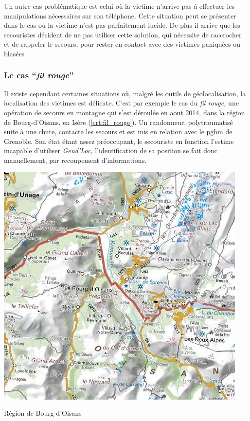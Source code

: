 Un autre cas problématique est celui où la victime n'arrive pas à
effectuer les manipulations nécessaires sur son téléphone. Cette
situation peut se présenter dans le cas ou la victime n'est pas
parfaitement lucide. De plus il arrive que les secouristes décident de
ne pas utiliser cette solution, qui nécessite de raccrocher et de
rappeler le secours, pour rester en contact avec des victimes
paniquées ou blasées

\subsubsection{Le cas \enquote{\emph{fil rouge}}}
\label{subsec:1-1-2-3}

Il existe cependant certaines situations où, malgré les outils de
géolocalisation, la localisation des victimes est délicate. C'est par
exemple le cas du \emph{fil rouge,} une opération de secours en
montagne qui s'est déroulée en aout 2014, dans la région de
Bourg-d'Oisans, en Isère (\autoref{crt:fil_rouge}). Un randonneur,
polytraumatisé suite à une chute, contacte les secours et est mis en
relation avec le \ac{pghm} de Grenoble. Son état étant assez
préoccupant, le secouriste en fonction l'estime incapable d'utiliser
\emph{Gend'Loc,} l'identification de sa position se fait donc
manuellement, par recoupement d'informations.

\begin{carte}
  \centering
  \includegraphics{../figures/bourdOisans.jpg}
  \caption{Région de Bourg-d'Oisans}
  \label{fig:fil_rouge}
\end{carte}

